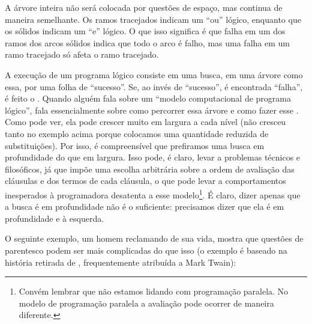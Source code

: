 \documentclass{article}
\begin{document}
A árvore inteira não será colocada por questões de espaço, mas
continua de maneira semelhante. Os ramos tracejados indicam um ``ou''
lógico, enquanto que os sólidos indicam um ``e'' lógico. O que isso
significa é que falha em um dos ramos dos arcos sólidos indica que
todo o arco é falho, mas uma falha em um ramo tracejado só afeta o
ramo tracejado.

A execução de um programa lógico consiste em uma busca, em uma árvore
como essa, por uma folha de ``sucesso''. Se, ao invés de ``sucesso'',
é encontrada ``falha'', é feito o . Quando
alguém fala sobre um ``modelo computacional de programa lógico'', fala
essencialmente sobre como percorrer essa árvore e como fazer esse
.  Como pode ver, ela pode crescer muito em
largura a cada nível (não cresceu tanto no exemplo acima porque
colocamos uma quantidade reduzida de substituições). Por isso, é
compreensível que prefiramos uma busca em profundidade do que em
largura. Isso pode, é claro, levar a problemas técnicos e filosóficos,
já que impõe uma escolha arbitrária sobre a ordem de avaliação das
cláusulas e dos termos de cada cláusula, o que pode levar a
comportamentos inesperados à programadora desatenta a esse
modelo\footnote{Convém lembrar que não estamos lidando com programação
  paralela.  No modelo de programação paralela a avaliação pode
  ocorrer de maneira diferente.}. É claro, dizer apenas que a busca é
em profundidade não é o suficiente: precisamos dizer que ela é em
profundidade e à esquerda.

O seguinte exemplo, um homem reclamando de sua vida, mostra que
questões de parentesco podem ser mais complicadas do que isso (o
exemplo é baseado na história retirada de \cite{antoni},
frequentemente atribuída a Mark Twain):

\end{document}
